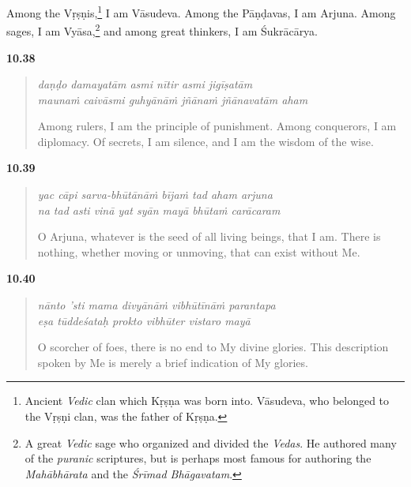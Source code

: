 {Among the Vṛṣṇis,\footnote{Ancient \textit{Vedic} clan which Kṛṣṇa was born into. Vāsudeva, who belonged to the Vṛṣṇi clan, was the father of Kṛṣṇa.} I am Vāsudeva. Among the Pāṇḍavas, I am Arjuna. Among sages, I am Vyāsa,\footnote{A great \textit{Vedic} sage who organized and divided the \textit{Vedas}. He authored many of the \textit{puranic} scriptures, but is perhaps most famous for authoring the \textit{Mahābhārata} and the \textit{Śrīmad Bhāgavatam}.} and among great thinkers, I am Śukrācārya.}


\par\noindent\textbf{10.38}\par
\begin{verse}
\textit{daṇḍo damayatām asmi nītir asmi jigīṣatām} \\
\textit{maunaṁ caivāsmi guhyānāṁ jñānaṁ jñānavatām aham}

\noindent Among rulers, I am the principle of punishment. Among conquerors, I am diplomacy. Of secrets, I am silence, and I am the wisdom of the wise.
\end{verse}
\par



\par\noindent\textbf{10.39}\par
\begin{verse}
\textit{yac cāpi sarva-bhūtānāṁ bījaṁ tad aham arjuna} \\
\textit{na tad asti vinā yat syān mayā bhūtaṁ carācaram}

\noindent O Arjuna, whatever is the seed of all living beings, that I am. There is nothing, whether moving or unmoving, that can exist without Me.
\end{verse}
\par



\par\noindent\textbf{10.40}\par
\begin{verse}
\textit{nānto ’sti mama divyānāṁ vibhūtīnāṁ parantapa} \\
\textit{eṣa tūddeśataḥ prokto vibhūter vistaro mayā}

\noindent O scorcher of foes, there is no end to My divine glories. This description spoken by Me is merely a brief indication of My glories.
\end{verse}
\par




